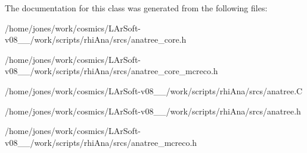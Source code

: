 The documentation for this class was generated from the following files\-:\begin{DoxyCompactItemize}
\item 
/home/jones/work/cosmics/\-L\-Ar\-Soft-\/v08\-\_\-\_/work/scripts/rhi\-Ana/srcs/anatree\-\_\-core.\-h\item 
/home/jones/work/cosmics/\-L\-Ar\-Soft-\/v08\-\_\-\_/work/scripts/rhi\-Ana/srcs/anatree\-\_\-core\-\_\-mcreco.\-h\item 
/home/jones/work/cosmics/\-L\-Ar\-Soft-\/v08\-\_\-\_/work/scripts/rhi\-Ana/srcs/anatree.\-C\item 
/home/jones/work/cosmics/\-L\-Ar\-Soft-\/v08\-\_\-\_/work/scripts/rhi\-Ana/srcs/anatree.\-h\item 
/home/jones/work/cosmics/\-L\-Ar\-Soft-\/v08\-\_\-\_/work/scripts/rhi\-Ana/srcs/anatree\-\_\-mcreco.\-h\end{DoxyCompactItemize}
